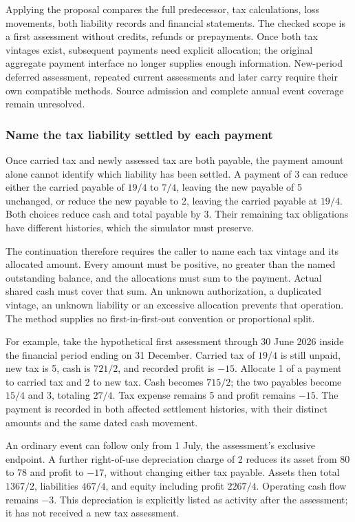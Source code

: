 Applying the proposal compares the full predecessor, tax calculations, loss
movements, both liability records and financial statements. The checked scope
is a first assessment without credits, refunds or prepayments. Once both tax
vintages exist, subsequent payments need explicit allocation; the original
aggregate payment interface no longer supplies enough information. New-period
deferred assessment, repeated current assessments and later carry require their
own compatible methods. Source admission and complete annual event coverage
remain unresolved.


\subsubsection*{Name the tax liability settled by each payment}
Once carried tax and newly assessed tax are both payable, the payment amount
alone cannot identify which liability has been settled. A payment of 3 can reduce
either the carried payable of $19/4$ to $7/4$, leaving the new payable of 5
unchanged, or reduce the new payable to 2, leaving the carried payable at $19/4$.
Both choices reduce cash and total payable by 3. Their remaining tax obligations
have different histories, which the simulator must preserve.

The continuation therefore requires the caller to name each tax vintage and its
allocated amount. Every amount must be positive, no greater than the named
outstanding balance, and the allocations must sum to the payment. Actual shared
cash must cover that sum. An unknown authorization, a duplicated vintage, an
unknown liability or an excessive allocation prevents that operation. The
method supplies no first-in-first-out convention or proportional split.

For example, take the hypothetical first assessment through 30 June 2026 inside
the financial period ending on 31 December. Carried tax of $19/4$ is still
unpaid, new tax is 5, cash is $721/2$, and recorded profit is $-15$. Allocate 1
of a payment to carried tax and 2 to new tax. Cash becomes $715/2$; the two
payables become $15/4$ and 3, totaling $27/4$. Tax expense remains 5 and profit
remains $-15$. The payment is recorded in both affected settlement histories,
with their distinct amounts and the same dated cash movement.

An ordinary event can follow only from 1 July, the assessment's exclusive
endpoint. A further right-of-use depreciation charge of 2 reduces its asset from
80 to 78 and profit to $-17$, without changing either tax payable. Assets then
total $1367/2$, liabilities $467/4$, and equity including profit $2267/4$.
Operating cash flow remains $-3$. This depreciation is explicitly listed as
activity after the assessment; it has not received a new tax assessment.

